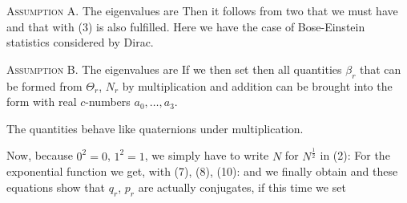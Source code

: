 \begin{paper}{1}
\textsc{Assumption A.} The eigenvalues are
Then it follows from two that we must have
and that with
(3) is also fulfilled. Here we have the case of Bose-Einstein statistics considered by Dirac.

\textsc{Assumption B.} The eigenvalues are
If we then set
then all quantities $\beta_r$ that can be formed from $\Theta_r$, $N_r$ by multiplication and addition can be brought into the form
with real $c$-numbers $a_0,\dots,a_3$.

The quantities
behave like quaternions under multiplication.

Now, because $0^2=0$, $1^2=1$, we simply have to write $N$ for $N^\frac{1}{2}$ in (2):
For the exponential function we get, with (7), (8), (10):
and we finally obtain
and
these equations show that $q_r$, $p_r$ are actually conjugates, if this time we set


\end{paper}
